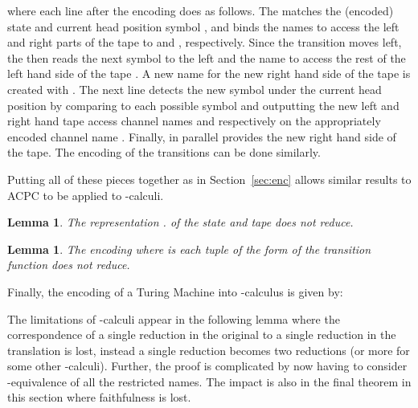 \documentclass[submission,copyright,creativecommons]{eptcs}
\newtheorem{lemma}[theorem]{Lemma}
\begin{document}
where each line after the encoding does as follows.
The  matches the (encoded) state  and current head position symbol ,
and binds the names
to access the left and right parts of the tape to  and , respectively.
Since the transition moves left, the  then reads the next symbol to the
left  and the name to access the rest of the left hand side of the tape .
A new name for the new right hand side of the tape is created with .
The next
line detects
the new symbol  under the current head position by
comparing to each possible symbol  and
outputting the new left and right hand tape access channel names  and  respectively
on the appropriately encoded channel name .
Finally, in parallel  provides the new right hand side of the tape.
The encoding of the  transitions can be done similarly.

Putting all of these pieces together as in Section~\ref{sec:enc} allows similar results
to ACPC to be applied to -calculi.

\begin{lemma}
\label{lem:tape-no-red-pi}
The representation
.
of the state  and tape 
does not reduce.
\end{lemma}

\begin{lemma}
\label{lem:trans-no-red-pi}
The encoding 
where  is each tuple of the form 
of the transition function 
does not reduce.
\end{lemma}

Finally, the encoding  of a Turing Machine into 
-calculus is given by:


The limitations of -calculi appear in the following lemma where the correspondence
of a single reduction in the original to a single reduction in the translation is lost,
instead a single reduction becomes two reductions (or more for some other -calculi).
Further, the proof is complicated by now having to consider -equivalence of all
the restricted names.
The impact is also in the final theorem in this section where faithfulness is lost.
\end{document}
